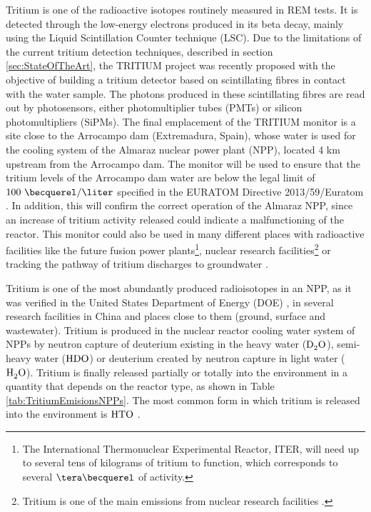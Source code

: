 Tritium is one of the radioactive isotopes routinely measured in REM tests. It is detected through the low-energy electrons produced in its beta decay, mainly using the Liquid Scintillation Counter technique (LSC). Due to the limitations of the current tritium detection techniques, described in section \ref{sec:StateOfTheArt}, the TRITIUM project was recently proposed with the objective of building a tritium detector based on scintillating fibres in contact with the water sample. The photons produced in these scintillating fibres are read out by photosensors, either photomultiplier tubes (PMTs) or silicon photomultipliers (SiPMs). The final emplacement of the TRITIUM monitor is a site close to the Arrocampo dam (Extremadura, Spain), whose water is used for the cooling system of the Almaraz nuclear power plant (NPP), located 4 km upstream from the Arrocampo dam. The monitor will be used to ensure that the tritium levels of the Arrocampo dam  water are below the legal limit of $100~\becquerel/\liter$ specified in the EURATOM Directive 2013/59/Euratom \cite{100BqL}. In addition, this will confirm the correct operation of the Almaraz NPP, since an increase of tritium activity released could indicate a malfunctioning of the reactor. This monitor could also be used in many different places with radioactive facilities like the future fusion power plants\footnote{The International Thermonuclear Experimental Reactor, ITER, will need up to several tens of kilograms of tritium to function, which corresponds to several $\tera\becquerel$ of activity.}, nuclear research facilities\footnote{Tritium is one of the main emissions from nuclear research facilities \cite{FERMILAB, BrookHavenNationalLaboratory}.} or tracking the pathway of tritium discharges to groundwater \cite{TrackingTritium}. 

Tritium is one of the most abundantly produced radioisotopes in an NPP, as it was verified in the United States Department of Energy (DOE) \cite{FiberDetector1a, FiberDetector1b}, in several research facilities in China \cite{CommonEmissionTritium} and places close to them (ground, surface and wastewater). Tritium is produced in the nuclear reactor cooling water system of NPPs by neutron capture of deuterium existing in the heavy water ($\ce{D_2 O}$), semi-heavy water ($\ce{H D O}$) or deuterium created by neutron capture in light water ($\ce{H_2 O}$). Tritium is finally released partially or totally into the environment in a quantity that depends on the reactor type, as shown in Table \ref{tab:TritiumEmisionsNPPs}. The most common form in which tritium is released into the environment is $\ce{HTO}$ \cite{CommonEmissionTritium}.

